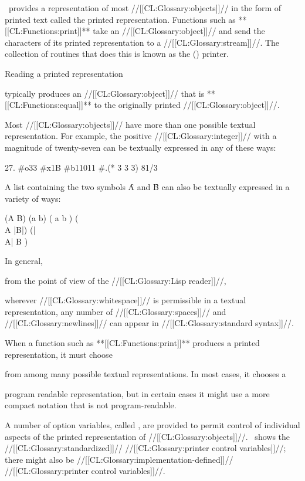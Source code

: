 



\clisp\ provides a representation of most //[[CL:Glossary:objects]]// in the form 
of printed text called the printed representation.
Functions such as **[[CL:Functions:print]]** take an //[[CL:Glossary:object]]// 
and send the characters of its printed representation to a //[[CL:Glossary:stream]]//. 
The collection of routines that does this is known as the (\clisp) printer.  


Reading a printed representation 


typically
produces an //[[CL:Glossary:object]]// that is **[[CL:Functions:equal]]** to the
originally printed //[[CL:Glossary:object]]//.



Most //[[CL:Glossary:objects]]// have more than one possible textual representation.
For example, the positive //[[CL:Glossary:integer]]// with a magnitude of twenty-seven
can be textually expressed in any of these ways:

    27.    #o33    #x1B    #b11011    #.(* 3 3 3)    81/3
\endcode

A list containing the two symbols \f{A} and \f{B} can also be textually
expressed in a variety of ways:

\code
 (A B)    (a b)    (  a  b )    (\\A |B|) 
(|\\A|
  B
)
\endcode

In general,



from the point of view of the //[[CL:Glossary:Lisp reader]]//,

wherever //[[CL:Glossary:whitespace]]// is permissible in a textual representation,
any number of //[[CL:Glossary:spaces]]// and //[[CL:Glossary:newlines]]// can appear in //[[CL:Glossary:standard syntax]]//.


When a function such as **[[CL:Functions:print]]** produces a printed representation,
it must choose 


from among many possible textual representations.
In most cases, it chooses a 


program readable representation,
but in certain cases it might use a more compact notation that is not 
program-readable.

A number of option variables, called
,
are provided to permit control of individual aspects of the 
printed representation of //[[CL:Glossary:objects]]//.
\Thenextfigure\ shows the //[[CL:Glossary:standardized]]// //[[CL:Glossary:printer control variables]]//;
there might also be //[[CL:Glossary:implementation-defined]]// //[[CL:Glossary:printer control variables]]//.

